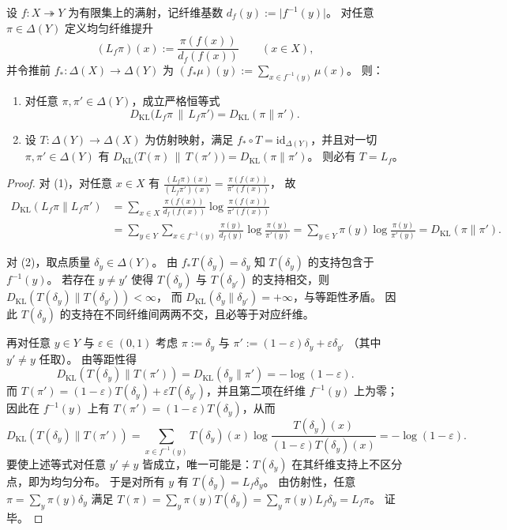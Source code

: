 
\begin{theorem}\label{thm:pom-uniform-lift-kl-isometry-uniqueness}
设 \(f:X\twoheadrightarrow Y\) 为有限集上的满射，记纤维基数 \(d_f(y):=\lvert f^{-1}(y)\rvert\)。
对任意 \(\pi\in\Delta(Y)\) 定义均匀纤维提升
\[
(L_f\pi)(x):=\frac{\pi(f(x))}{d_f(f(x))}\qquad(x\in X),
\]
并令推前 \(f_\ast:\Delta(X)\to\Delta(Y)\) 为 \((f_\ast\mu)(y):=\sum_{x\in f^{-1}(y)}\mu(x)\)。
则：
\begin{enumerate}
  \item 对任意 \(\pi,\pi'\in\Delta(Y)\)，成立严格恒等式
  \[
  \boxed{\;D_{\mathrm{KL}}\!\bigl(L_f\pi\,\|\,L_f\pi'\bigr)=D_{\mathrm{KL}}(\pi\|\pi').\;}
  \]
  \item 设 \(T:\Delta(Y)\to\Delta(X)\) 为仿射映射，满足 \(f_\ast\circ T=\mathrm{id}_{\Delta(Y)}\)，并且对一切 \(\pi,\pi'\in\Delta(Y)\) 有
  \(
  D_{\mathrm{KL}}\!\bigl(T(\pi)\,\|\,T(\pi')\bigr)=D_{\mathrm{KL}}(\pi\|\pi')
  \)。
  则必有 \(T=L_f\)。
\end{enumerate}
\end{theorem}
\begin{proof}
对 (1)，对任意 \(x\in X\) 有
\(
\frac{(L_f\pi)(x)}{(L_f\pi')(x)}=\frac{\pi(f(x))}{\pi'(f(x))}
\)，
故
\[
\begin{aligned}
D_{\mathrm{KL}}(L_f\pi\|L_f\pi')
&=\sum_{x\in X}\frac{\pi(f(x))}{d_f(f(x))}\log\frac{\pi(f(x))}{\pi'(f(x))}\\
&=\sum_{y\in Y}\sum_{x\in f^{-1}(y)}\frac{\pi(y)}{d_f(y)}\log\frac{\pi(y)}{\pi'(y)}
=\sum_{y\in Y}\pi(y)\log\frac{\pi(y)}{\pi'(y)}
=D_{\mathrm{KL}}(\pi\|\pi').
\end{aligned}
\]
\par
对 (2)，取点质量 \(\delta_y\in\Delta(Y)\)。
由 \(f_\ast T(\delta_y)=\delta_y\) 知 \(T(\delta_y)\) 的支持包含于 \(f^{-1}(y)\)。
若存在 \(y\neq y'\) 使得 \(T(\delta_y)\) 与 \(T(\delta_{y'})\) 的支持相交，则
\(
D_{\mathrm{KL}}(T(\delta_y)\|T(\delta_{y'}))<\infty
\)，
而 \(D_{\mathrm{KL}}(\delta_y\|\delta_{y'})=+\infty\)，与等距性矛盾。
因此 \(T(\delta_y)\) 的支持在不同纤维间两两不交，且必等于对应纤维。
\par
再对任意 \(y\in Y\) 与 \(\varepsilon\in(0,1)\) 考虑
\(
\pi:=\delta_y
\) 与
\(
\pi':=(1-\varepsilon)\delta_y+\varepsilon\delta_{y'}
\)
（其中 \(y'\neq y\) 任取）。
由等距性得
\[
D_{\mathrm{KL}}(T(\delta_y)\|T(\pi'))=D_{\mathrm{KL}}(\delta_y\|\pi')=-\log(1-\varepsilon).
\]
而 \(T(\pi')=(1-\varepsilon)T(\delta_y)+\varepsilon T(\delta_{y'})\)，并且第二项在纤维 \(f^{-1}(y)\) 上为零；
因此在 \(f^{-1}(y)\) 上有 \(T(\pi')=(1-\varepsilon)T(\delta_y)\)，从而
\[
D_{\mathrm{KL}}(T(\delta_y)\|T(\pi'))
=\sum_{x\in f^{-1}(y)}T(\delta_y)(x)\log\frac{T(\delta_y)(x)}{(1-\varepsilon)T(\delta_y)(x)}
=-\log(1-\varepsilon).
\]
要使上述等式对任意 \(y'\neq y\) 皆成立，唯一可能是：\(T(\delta_y)\) 在其纤维支持上不区分点，即为均匀分布。
于是对所有 \(y\) 有 \(T(\delta_y)=L_f\delta_y\)。
由仿射性，任意 \(\pi=\sum_y\pi(y)\delta_y\) 满足
\(
T(\pi)=\sum_y\pi(y)T(\delta_y)=\sum_y\pi(y)L_f\delta_y=L_f\pi
\)。
证毕。
\end{proof}

